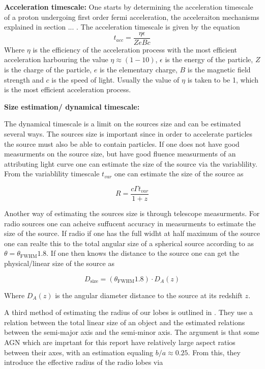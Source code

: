 \textbf{Acceleration timescale:}
One starts by determining the acceleration timescale of a proton undergoing first order fermi acceleration, the acceleraiton mechanisms explained in section ... . The acceleration timescale is given by the equation
\begin{equation}
    t_{acc} =  \frac{\eta \epsilon}{Z e B c}
\end{equation}
Where $\eta$ is the efficiency of the acceleration process with the most efficient acceleration harbouring the value $\eta \approx (1-10)$, $\epsilon$ is the energy of the particle, $Z$ is the charge of the particle, $e$ is the elementary charge, $B$ is the magnetic field strength and $c$ is the speed of light. 
Usually the value of $\eta$ is taken to be 1, which is the most efficient acceleration process.

\textbf{Size estimation/ dynamical timescale:}

The dynamical timescale is a limit on the sources size and can be estimated several ways. The sources size is important since in order to accelerate particles the source must also be able to contain particles. If one does not have good measurments on the source size, but have good fluence measurments of an attributing light curve one can estimate the size of the source via the variablility. From the variablility timescale $t_{var}$ one can estimate the size of the source as

\begin{equation}
    R = \frac{c \Gamma t_{var}}{1+z}
\end{equation}

Another way of estimating the sources size is through telescope measurments. For radio sources one can acheive suffucent accuracy in measurments to estimate the size of the source. If radio if one has the full widht at half maximum of the source one can realte this to the total angular size of a spherical source according to \cite{1983ApJ...264..296M} as $\theta = \theta_{\text{FWHM}} 1.8$. If one then knows the distance to the source one can get the physical/linear size of the source as 

\begin{equation}
    D_{\text{size}} = \left(\theta_{\text{FWHM}}1.8 \right) \cdot D_A(z)
\end{equation}

Where $D_A(z)$ is the angular diameter distance to the source at its redshift $z$.

A third method of estimating the radius of our lobes is outlined in \cite{W_jtowicz_2020}. They use a relation between the total linear size of an object and the estimated relations between the semi-major axis and the semi-minor axis. The argument is that some AGN which are imprtant for this report have relatively large aspect ratios between their axes, with an estimation equaling $b/a \approx 0.25$. From this, they introduce the effective radius of the radio lobes via

